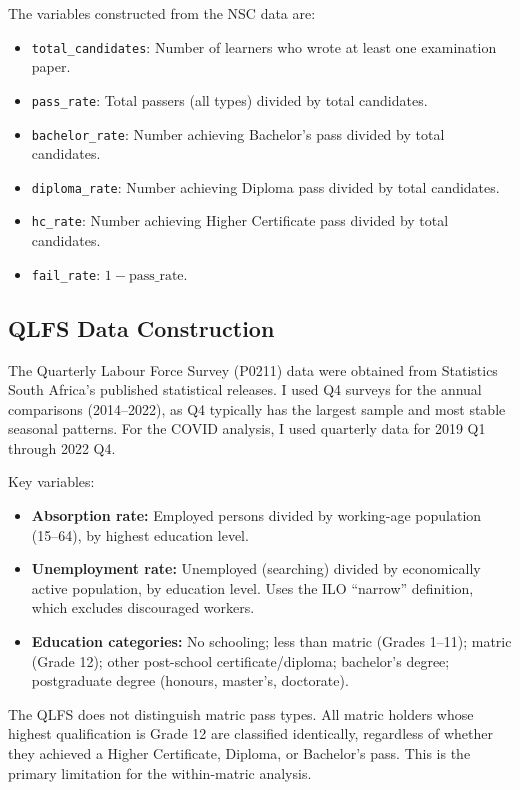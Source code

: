 \documentclass[12pt]{article}
\begin{document}
The variables constructed from the NSC data are:
\begin{itemize}
    \item \texttt{total\_candidates}: Number of learners who wrote at least one examination paper.
    \item \texttt{pass\_rate}: Total passers (all types) divided by total candidates.
    \item \texttt{bachelor\_rate}: Number achieving Bachelor's pass divided by total candidates.
    \item \texttt{diploma\_rate}: Number achieving Diploma pass divided by total candidates.
    \item \texttt{hc\_rate}: Number achieving Higher Certificate pass divided by total candidates.
    \item \texttt{fail\_rate}: $1 - \text{pass\_rate}$.
\end{itemize}

\subsection{QLFS Data Construction}

The Quarterly Labour Force Survey (P0211) data were obtained from Statistics South Africa's published statistical releases. I used Q4 surveys for the annual comparisons (2014--2022), as Q4 typically has the largest sample and most stable seasonal patterns. For the COVID analysis, I used quarterly data for 2019 Q1 through 2022 Q4.

Key variables:
\begin{itemize}
    \item \textbf{Absorption rate:} Employed persons divided by working-age population (15--64), by highest education level.
    \item \textbf{Unemployment rate:} Unemployed (searching) divided by economically active population, by education level. Uses the ILO ``narrow'' definition, which excludes discouraged workers.
    \item \textbf{Education categories:} No schooling; less than matric (Grades 1--11); matric (Grade 12); other post-school certificate/diploma; bachelor's degree; postgraduate degree (honours, master's, doctorate).
\end{itemize}

The QLFS does not distinguish matric pass types. All matric holders whose highest qualification is Grade 12 are classified identically, regardless of whether they achieved a Higher Certificate, Diploma, or Bachelor's pass. This is the primary limitation for the within-matric analysis.
\end{document}
